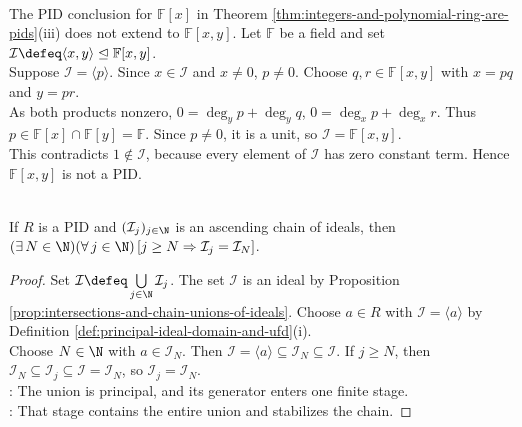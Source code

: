 \begin{counterexample} \label{cex:two-variable-polynomial-ring-not-pid} \\
The PID conclusion for $\mathbb{F}[x]$ in Theorem \ref{thm:integers-and-polynomial-ring-are-pids}(iii) does not extend to $\mathbb{F}[x,y]$. Let $\mathbb{F}$ be a field and set $\mathcal{I}\defeq\langle x,y\rangle\trianglelefteq\mathbb{F}[x,y]$.\\
Suppose $\mathcal{I}=\langle p\rangle$. Since $x\in\mathcal{I}$ and $x\neq0$, $p\neq0$. Choose $q,r\in\mathbb{F}[x,y]$ with $x=pq$ and $y=pr$.\\
As both products nonzero, $0=\deg_y p+\deg_y q$, $0=\deg_x p+\deg_x r$. Thus $p\in\mathbb{F}[x]\cap\mathbb{F}[y]=\mathbb{F}$. Since $p\neq0$, it is a unit, so $\mathcal{I}=\mathbb{F}[x,y]$.\\
This contradicts $1\notin\mathcal{I}$, because every element of $\mathcal{I}$ has zero constant term. Hence $\mathbb{F}[x,y]$ is not a PID.
\end{counterexample}

\begin{proposition} \label{prop:pid-ascending-chain-condition} \\
If $R$ is a PID and $(\mathcal{I}_j)_{j\in\N}$ is an ascending chain of ideals, then $(\exists\,N\in\N)(\forall\,j\in\N)\,[j\geq N\Rightarrow\mathcal{I}_j=\mathcal{I}_N]$.
\begin{proof}
Set $\mathcal{I}\defeq\bigcup\limits_{j\in\N}\mathcal{I}_j$. The set $\mathcal{I}$ is an ideal by Proposition \ref{prop:intersections-and-chain-unions-of-ideals}. Choose $a\in R$ with $\mathcal{I}=\langle a\rangle$ by Definition \ref{def:principal-ideal-domain-and-ufd}(i).\\
Choose $N\in\N$ with $a\in\mathcal{I}_N$. Then $\mathcal{I}=\langle a\rangle\subseteq\mathcal{I}_N\subseteq\mathcal{I}$. If $j\geq N$, then $\mathcal{I}_N\subseteq\mathcal{I}_j\subseteq\mathcal{I}=\mathcal{I}_N$, so $\mathcal{I}_j=\mathcal{I}_N$.\\
: The union is principal, and its generator enters one finite stage.\\
: That stage contains the entire union and stabilizes the chain.
\end{proof}
\end{proposition}

